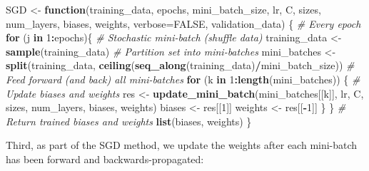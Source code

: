 \documentclass[]{book}
\newenvironment{Shaded}{\begin{snugshade}}{\end{snugshade}}
\newcommand{\CommentTok}[1]{\textcolor[rgb]{0.56,0.35,0.01}{\textit{#1}}}
\newcommand{\ControlFlowTok}[1]{\textcolor[rgb]{0.13,0.29,0.53}{\textbf{#1}}}
\newcommand{\DataTypeTok}[1]{\textcolor[rgb]{0.13,0.29,0.53}{#1}}
\newcommand{\DecValTok}[1]{\textcolor[rgb]{0.00,0.00,0.81}{#1}}
\newcommand{\KeywordTok}[1]{\textcolor[rgb]{0.13,0.29,0.53}{\textbf{#1}}}
\newcommand{\NormalTok}[1]{#1}
\newcommand{\OperatorTok}[1]{\textcolor[rgb]{0.81,0.36,0.00}{\textbf{#1}}}
\newcommand{\OtherTok}[1]{\textcolor[rgb]{0.56,0.35,0.01}{#1}}
\newcommand{\StringTok}[1]{\textcolor[rgb]{0.31,0.60,0.02}{#1}}
\begin{document}
\begin{Shaded}
\begin{Highlighting}[]
\NormalTok{SGD <-}\StringTok{ }\ControlFlowTok{function}\NormalTok{(training_data, epochs, mini_batch_size, lr, C, sizes, }
\NormalTok{                num_layers, biases, weights,}
                 \DataTypeTok{verbose=}\OtherTok{FALSE}\NormalTok{, validation_data)}
\NormalTok{ \{}
   \CommentTok{# Every epoch}
   \ControlFlowTok{for}\NormalTok{ (j }\ControlFlowTok{in} \DecValTok{1}\OperatorTok{:}\NormalTok{epochs)\{}
     \CommentTok{# Stochastic mini-batch (shuffle data)}
\NormalTok{     training_data <-}\StringTok{ }\KeywordTok{sample}\NormalTok{(training_data)}
     \CommentTok{# Partition set into mini-batches}
\NormalTok{     mini_batches <-}\StringTok{ }\KeywordTok{split}\NormalTok{(training_data, }
                           \KeywordTok{ceiling}\NormalTok{(}\KeywordTok{seq_along}\NormalTok{(training_data)}\OperatorTok{/}\NormalTok{mini_batch_size))}
     \CommentTok{# Feed forward (and back) all mini-batches}
     \ControlFlowTok{for}\NormalTok{ (k }\ControlFlowTok{in} \DecValTok{1}\OperatorTok{:}\KeywordTok{length}\NormalTok{(mini_batches)) \{}
       \CommentTok{# Update biases and weights}
\NormalTok{       res <-}\StringTok{ }\KeywordTok{update_mini_batch}\NormalTok{(mini_batches[[k]], lr, C, sizes, num_layers, biases, weights)}
\NormalTok{       biases <-}\StringTok{ }\NormalTok{res[[}\DecValTok{1}\NormalTok{]]}
\NormalTok{       weights <-}\StringTok{ }\NormalTok{res[[}\OperatorTok{-}\DecValTok{1}\NormalTok{]]}
\NormalTok{     \}}
\NormalTok{   \}}
   \CommentTok{# Return trained biases and weights}
   \KeywordTok{list}\NormalTok{(biases, weights)}
\NormalTok{ \}}
\end{Highlighting}
\end{Shaded}

Third, as part of the SGD method, we update the weights after each mini-batch has been forward and backwards-propagated:
\end{document}
